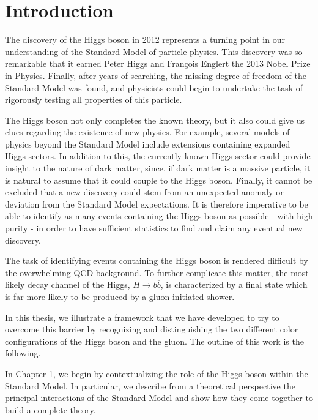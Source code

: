 \documentclass[10pt,a4paper]{book}
\begin{document}
\tableofcontents

\chapter*{Introduction}

The discovery of the Higgs boson in 2012 represents a turning point in our understanding of the Standard Model of particle physics. This discovery was so remarkable that it earned Peter Higgs and Fran\c{c}ois Englert the 2013 Nobel Prize in Physics. Finally, after years of searching, the missing degree of freedom of the Standard Model was found, and physicists could begin to undertake the task of rigorously testing all properties of this particle.

The Higgs boson not only completes the known theory, but it also could give us clues regarding the existence of new physics. For example, several models of physics beyond the Standard Model include extensions containing expanded Higgs sectors. In addition to this, the currently known Higgs sector could provide insight to the nature of dark matter, since, if dark matter is a massive particle, it is natural to assume that it could couple to the Higgs boson.  Finally, it cannot be excluded that a new discovery could stem from an unexpected anomaly or deviation from the Standard Model expectations. It is therefore imperative to be able to identify as many events containing the Higgs boson as possible - with high purity - in order to have sufficient statistics to find and claim any eventual new discovery.

The task of identifying events containing the Higgs boson is rendered difficult by the overwhelming QCD background. To further complicate this matter, the most likely decay channel of the Higgs, $H\rightarrow b\overline{b}$, is characterized by a final state which is far more likely to be produced by a gluon-initiated shower. 

In this thesis, we illustrate a framework that we have developed to try to overcome this barrier by recognizing and distinguishing the two different color configurations of the Higgs boson and the gluon. The outline of this work is the following.

In Chapter 1, we begin by contextualizing the role of the Higgs boson within the Standard Model. In particular, we describe from a theoretical perspective the principal interactions of the Standard Model and show how they come together to build a complete theory.
\end{document}
